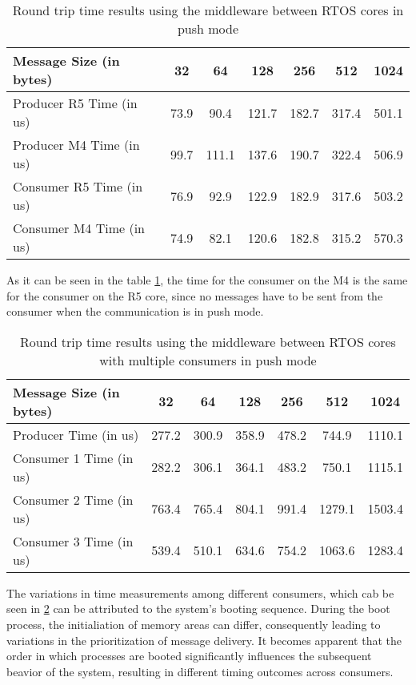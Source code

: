 \begin{table}
\centering
\caption{Round trip time results using the middleware between RTOS cores in
         push mode}
\label{table:broker_communication_RTOS_cores_push}
\begin{tabular}{lcccccc}
\toprule
Message Size (in bytes) & 32 & 64 & 128 & 256 & 512 & 1024 \\
\midrule
Producer R5 Time (in us) & 73.9 & 90.4 & 121.7 & 182.7 & 317.4 & 501.1 \\
Producer M4 Time (in us) & 99.7 & 111.1 & 137.6 & 190.7 & 322.4 & 506.9 \\
Consumer R5 Time (in us) & 76.9 & 92.9 & 122.9 & 182.9 & 317.6 & 503.2 \\
Consumer M4 Time (in us) & 74.9 & 82.1 & 120.6 & 182.8 & 315.2 & 570.3 \\
\bottomrule
\end{tabular}
\end{table}

As it can be seen in the table \ref{table:broker_communication_RTOS_cores_push},
the time for the consumer on the M4 is the same for the consumer on the R5 core,
since no messages have to be sent from the consumer when the communication is
in push mode.

\begin{table}
\centering
\caption{Round trip time results using the middleware between RTOS cores with
         multiple consumers in push mode}
\label{table:broker_communication_RTOS_cores_multiple_consumers_push}
\begin{tabular}{lcccccc}
\toprule
Message Size (in bytes) & 32 & 64 & 128 & 256 & 512 & 1024 \\
\midrule
Producer Time (in us) & 277.2 & 300.9 & 358.9 & 478.2 & 744.9 & 1110.1 \\
Consumer 1 Time (in us) & 282.2 & 306.1 & 364.1 & 483.2 & 750.1 & 1115.1 \\
Consumer 2 Time (in us) & 763.4 & 765.4 & 804.1 & 991.4 & 1279.1 & 1503.4 \\
Consumer 3 Time (in us) & 539.4 & 510.1 & 634.6 & 754.2 & 1063.6 & 1283.4 \\
\bottomrule
\end{tabular}
\end{table}

The variations in time measurements among different consumers, which cab be
seen in \ref{table:broker_communication_RTOS_cores_multiple_consumers_push}
can be attributed to the system's booting sequence.
During the boot process, the initialiation of memory areas can differ,
consequently leading to variations in the prioritization of message delivery.
It becomes apparent that the order in which processes are booted significantly
influences the subsequent beavior of the system, resulting in different timing
outcomes across consumers.

